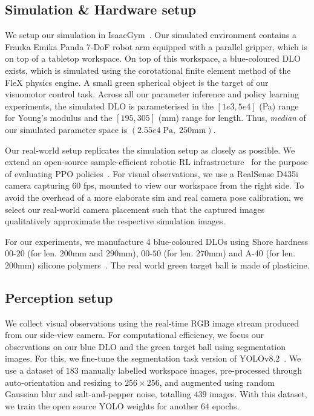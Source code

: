 \subsection{Simulation \& Hardware setup}
\label{subsec:sim-hw-setup}

We setup our simulation in IsaacGym~\cite{makoviychuk2021isaac}. Our simulated environment contains a Franka Emika Panda 7-DoF robot arm equipped with a parallel gripper, which is on top of a tabletop workspace. On top of this workspace, a blue-coloured DLO exists, which is simulated using the corotational finite element method of the FleX physics engine. A small green spherical object is the target of our visuomotor control task. Across all our parameter inference and policy learning experiments, the simulated DLO is parameterised in the $[1e3, 5e4]$ (Pa) range for Young's modulus and the $[195, 305]$ (mm) range for length. Thus, \emph{median} of our simulated parameter space is $(2.55e4 \; \text{Pa}, \; 250\text{mm})$.

Our real-world setup replicates the simulation setup as closely as possible. We extend an open-source sample-efficient robotic RL infrastructure~\cite{luo2024serl} for the purpose of evaluating PPO policies~\cite{stable-baselines3}. For visual observations, we use a RealSense D435i camera capturing $60$ fps, mounted to view our workspace from the right side. To avoid the overhead of a more elaborate sim and real camera pose calibration, we select our real-world camera placement such that the captured images qualitatively approximate the respective simulation images. 

For our experiments, we manufacture $4$ blue-coloured DLOs using Shore hardness $\text{00-20}$ (for len. $\text{200mm}$ and $\text{290mm}$), $\text{00-50}$ (for len. $\text{270mm}$) and A-40 (for len. $\text{200mm}$) silicone polymers~\cite{liao2020ecoflex}. The real world green target ball is made of plasticine.

\subsection{Perception setup}
\label{subsec:perc-setup}

We collect visual observations using the real-time RGB image stream produced from our side-view camera. For computational efficiency, we focus our observations on our blue DLO and the green target ball using segmentation images. For this, we fine-tune the segmentation task version of YOLOv8.2~\cite{redmon2016you}. 
We use a dataset of $183$ manually labelled workspace images, pre-processed through auto-orientation and resizing to $256\times256$, and augmented using random Gaussian blur and salt-and-pepper noise, totalling $439$ images. With this dataset, we train the open source YOLO weights for another $64$ epochs. 

